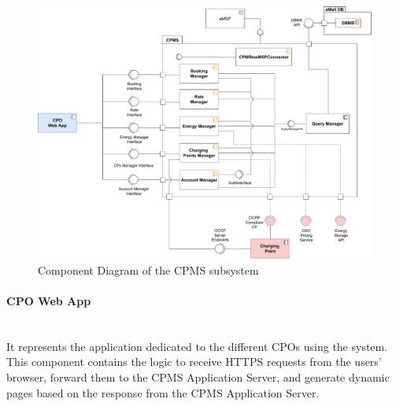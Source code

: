 \begin{figure}[H]
    \centering
    \hspace*{-2cm}
    \includegraphics[scale=0.5]{src/ComponentDiagram/cpms_component_diagram.pdf}
    \caption{Component Diagram of the CPMS subsystem}
\end{figure}

\paragraph*{CPO Web App} \hfill \\
It represents the application dedicated to the different CPOs using the system. This component contains the logic to receive HTTPS requests from the users' browser,
forward them to the CPMS Application Server, and generate dynamic pages based on the response from the CPMS Application Server.

